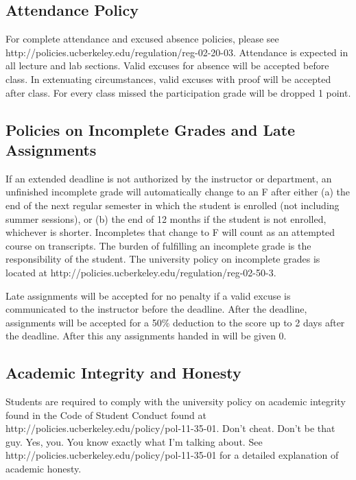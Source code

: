\documentclass[11pt]{article}
\begin{document}
\subsection*{Attendance Policy}
\footnotesize{For complete attendance and excused absence policies, please see http://policies.ucberkeley.edu/regulation/reg-02-20-03. Attendance is expected in all lecture and lab sections. Valid excuses for absence will be accepted before class. In extenuating circumstances, valid excuses with proof will be accepted after class. For every class missed the participation grade will be dropped 1 point.}

\subsection*{Policies on Incomplete Grades and Late Assignments}
\footnotesize{If an extended deadline is not authorized by the instructor or department, an unfinished incomplete grade will automatically change to an F after either (a) the end of the next regular semester in which the student is enrolled (not including summer sessions), or (b) the end of 12 months if the student is not enrolled, whichever is shorter. Incompletes that change to F will count as an attempted course on transcripts. The burden of fulfilling an incomplete grade is the responsibility of the student. The university policy on incomplete grades is located at http://policies.ucberkeley.edu/regulation/reg-02-50-3.}

\footnotesize{Late assignments will be accepted for no penalty if a valid excuse is communicated to the instructor before the deadline. After the deadline, assignments will be accepted for a 50\% deduction to the score up to 2 days after the deadline. After this any assignments handed in will be given 0.}

\subsection*{Academic Integrity and Honesty}
\footnotesize{Students are required to comply with the university policy on academic integrity found in the Code of Student Conduct found at http://policies.ucberkeley.edu/policy/pol-11-35-01. Don't cheat. Don't be that guy. Yes, you. You know exactly what I'm talking about. See http://policies.ucberkeley.edu/policy/pol-11-35-01 for a detailed explanation of academic honesty.}
\end{document}
